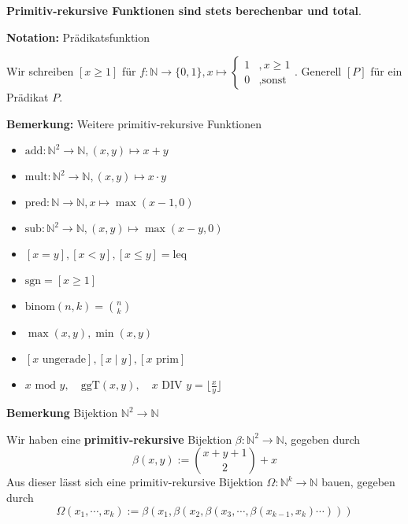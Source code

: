 \documentclass[a4paper,graphics,11pt]{article}
\begin{document}
\textbf{Primitiv-rekursive Funktionen sind stets berechenbar und total}.

\strut

\textbf{Notation:} Prädikatsfunktion

Wir schreiben $[x \geq 1]$ für $f : \mathbb{N} \to \{0,1\}, x \mapsto \begin{cases}1 &, x \geq 1\\ 0 &, \text{sonst}\end{cases}$. Generell $[P]$ für ein Prädikat $P$.

\newpage

\textbf{Bemerkung:} Weitere primitiv-rekursive Funktionen

\begin{minipage}{.5\textwidth}
\begin{itemize}
    \item $\text{add}:\mathbb{N}^2 \to \mathbb{N}, (x,y) \mapsto x+y$
    \item $\text{mult}: \mathbb{N}^2 \to \mathbb{N}, (x,y) \mapsto x \cdot y$
    \item $\text{pred}: \mathbb{N} \to \mathbb{N}, x \mapsto \max(x-1, 0)$
    \item $\text{sub}: \mathbb{N}^2 \to \mathbb{N}, (x,y) \mapsto \max(x-y, 0)$
    \item $[x = y], [x < y], [x \leq y] = \text{leq}$
\end{itemize}
\end{minipage}
\begin{minipage}{.5\textwidth}
\begin{itemize}
    \item $\text{sgn} = [x \geq 1]$
    \item $\text{binom}(n,k) = \binom{n}{k}$
    \item $\max(x,y), \min(x,y)$
    \item $[x \text{ ungerade}], [x \mid y], [x \text{ prim}]$
    \item $x\text{ mod } y,\quad \text{ggT}(x,y),\quad x\text{ DIV }y = \lfloor\frac{x}{y}\rfloor$
\end{itemize}
\end{minipage}

\strut

\textbf{Bemerkung} Bijektion $\mathbb{N}^2 \to \mathbb{N}$

Wir haben eine \textbf{primitiv-rekursive} Bijektion $\beta : \mathbb{N}^2 \to \mathbb{N}$, gegeben durch
$$
    \beta(x,y) := \binom{x+y+1}{2}+x
$$
Aus dieser lässt sich eine primitiv-rekursive Bijektion $\Omega : \mathbb{N}^{k} \to \mathbb{N}$ bauen, gegeben durch
$$
    \Omega(x_1,\cdots,x_k) := \beta(x_1,\beta(x_2,\beta(x_3,\cdots,\beta(x_{k-1},x_k)\cdots)))
$$
\end{document}
